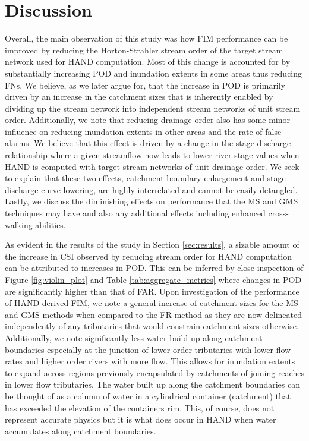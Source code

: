 \documentclass[draft]{dependencies/agujournal2019}
\begin{document}
\section{Discussion}
\label{sec:discussion}
%
Overall, the main observation of this study was how FIM performance can be improved by reducing the Horton-Strahler stream order of the target stream network used for HAND computation.
Most of this change is accounted for by substantially increasing POD and inundation extents in some areas thus reducing FNs.
We believe, as we later argue for, that the increase in POD is primarily driven by an increase in the catchment sizes that is inherently enabled by dividing up the stream network into independent stream networks of unit stream order.
Additionally, we note that reducing drainage order also has some minor influence on reducing inundation extents in other areas and the rate of false alarms.
We believe that this effect is driven by a change in the stage-discharge relationship where a given streamflow now leads to lower river stage values when HAND is computed with target stream networks of unit drainage order.
We seek to explain that these two effects, catchment boundary enlargement and stage-discharge curve lowering, are highly interrelated and cannot be easily detangled.
Lastly, we discuss the diminishing effects on performance that the MS and GMS techniques may have and also any additional effects including enhanced cross-walking abilities.

As evident in the results of the study in Section \ref{sec:results}, a sizable amount of the increase in CSI observed by reducing stream order for HAND computation can be attributed to increases in POD.
This can be inferred by close inspection of Figure \ref{fig:violin_plot} and Table \ref{tab:aggregate_metrics} where changes in POD are significantly higher than that of FAR.
Upon investigation of the performance of HAND derived FIM, we note a general increase of catchment sizes for the MS and GMS methods when compared to the FR method as they are now delineated independently of any tributaries that would constrain catchment sizes otherwise.
Additionally, we note significantly less water build up along catchment boundaries especially at the junction of lower order tributaries with lower flow rates and higher order rivers with more flow.
This allows for inundation extents to expand across regions previously encapsulated by catchments of joining reaches in lower flow tributaries.
The water built up along the catchment boundaries can be thought of as a column of water in a cylindrical container (catchment) that has exceeded the elevation of the containers rim.
This, of course, does not represent accurate physics but it is what does occur in HAND when water accumulates along catchment boundaries.
\end{document}
